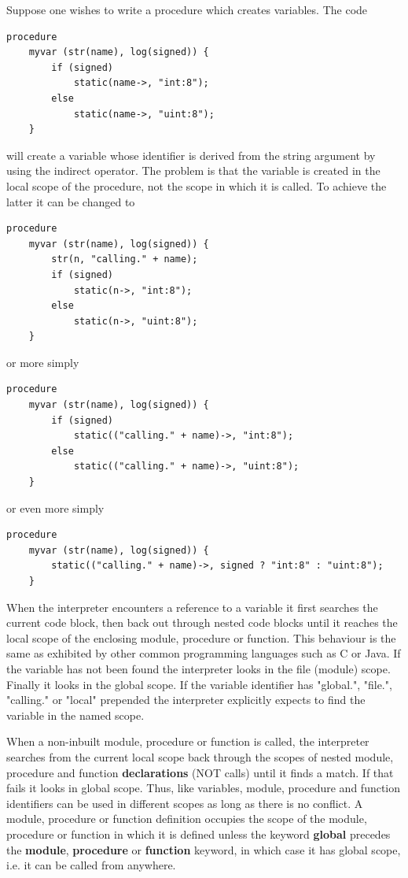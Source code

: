 \documentclass[10pt,a4paper,twoside,fleqn]{article}
\newcommand{\kwd}[1]{{\bf #1}} %
\begin{document}
    Suppose one wishes to write a procedure which creates variables. The code
    \begin{lstlisting}[language=threepl]
    procedure
    myvar (str(name), log(signed)) {
        if (signed)
            static(name->, "int:8");
        else
            static(name->, "uint:8");
    }
    \end{lstlisting}
    will create a variable whose identifier is derived from the string argument
    by using the indirect operator. The problem is that the variable is
    created in the local scope of the procedure, not the scope in which it is
    called. To achieve the latter it can be changed to
    \begin{lstlisting}[language=threepl]
    procedure
    myvar (str(name), log(signed)) {
        str(n, "calling." + name);
        if (signed)
            static(n->, "int:8");
        else
            static(n->, "uint:8");
    }
    \end{lstlisting}
    or more simply
    \begin{lstlisting}[language=threepl]
    procedure
    myvar (str(name), log(signed)) {
        if (signed)
            static(("calling." + name)->, "int:8");
        else
            static(("calling." + name)->, "uint:8");
    }
    \end{lstlisting}
    or even more simply
    \begin{lstlisting}[language=threepl]
    procedure
    myvar (str(name), log(signed)) {
        static(("calling." + name)->, signed ? "int:8" : "uint:8");
    }
    \end{lstlisting}

    When the interpreter encounters a reference to a variable it first searches
    the current code block, then back out through nested code blocks until it
    reaches the local scope of the enclosing module, procedure or function. This
    behaviour is the same  as exhibited by other common programming languages such
    as C or Java. If the variable has not been found the interpreter looks in the
    file (module) scope. Finally it looks in the global scope. If the variable
    identifier has "global.", "file.", "calling." or "local" prepended the
    interpreter explicitly expects to find the variable in the named scope.        
    
    When a non-inbuilt module, procedure or function is called, the interpreter
    searches from the current local scope back through the scopes of nested module,
    procedure and function {\bf declarations} (NOT calls) until it finds a match.
    If that fails it looks in global scope. Thus, like variables, module, procedure
    and function identifiers can be used in different scopes as long as there is no
    conflict. A module, procedure or function definition occupies the scope of the
    module, procedure or function in which it is defined unless the keyword
    \kwd{global} precedes the \kwd{module}, \kwd{procedure} or \kwd{function}
    keyword, in which case it has global scope, i.e. it can be called from anywhere.
    
\end{document}
